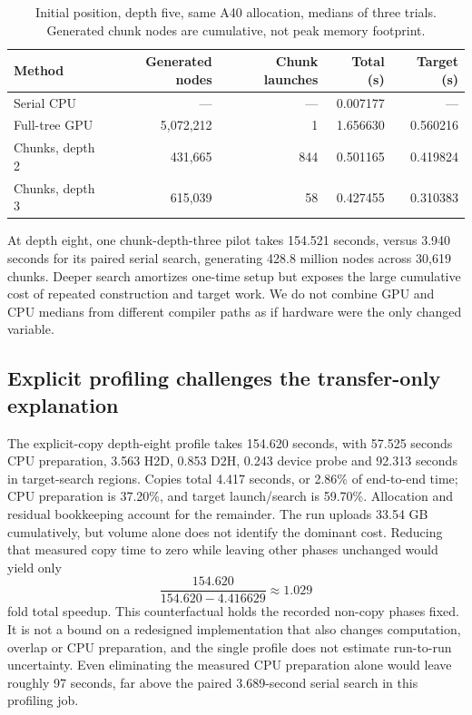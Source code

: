 \documentclass[11pt,a4paper]{article}
\begin{document}
\begin{table}[!htbp]\centering\small
\caption{Initial position, depth five, same A40 allocation, medians of three
trials. Generated chunk nodes are cumulative, not peak memory footprint.}
\label{tab:gpu}
\begin{tabular}{@{}lrrrr@{}}\toprule
Method & Generated nodes & Chunk launches & Total (s) & Target (s)\\\midrule
Serial CPU & --- & --- & 0.007177 & ---\\
Full-tree GPU & 5,072,212 & 1 & 1.656630 & 0.560216\\
Chunks, depth 2 & 431,665 & 844 & 0.501165 & 0.419824\\
Chunks, depth 3 & 615,039 & 58 & 0.427455 & 0.310383\\\bottomrule
\end{tabular}\end{table}

At depth eight, one chunk-depth-three pilot takes 154.521 seconds, versus
3.940 seconds for its paired serial search, generating 428.8 million nodes
across 30,619 chunks. Deeper search amortizes one-time setup but exposes the
large cumulative cost of repeated construction and target work. We do not
combine GPU and CPU medians from different compiler paths as if hardware were
the only changed variable.

\subsection{Explicit profiling challenges the transfer-only explanation}
The explicit-copy depth-eight profile takes 154.620 seconds, with 57.525
seconds CPU preparation, 3.563 H2D, 0.853 D2H, 0.243 device probe and 92.313
seconds in target-search regions. Copies total 4.417 seconds, or 2.86\% of
end-to-end time; CPU preparation is 37.20\%, and target launch/search is
59.70\%. Allocation and residual bookkeeping account for the remainder.
The run uploads 33.54 GB cumulatively, but volume alone does not identify the
dominant cost. Reducing that measured copy time to zero while leaving other
phases unchanged would yield only
\begin{equation}
  \frac{154.620}{154.620-4.416629}\approx 1.029
\end{equation}
fold total speedup. This counterfactual holds the recorded non-copy phases fixed. It is not a
bound on a redesigned implementation that also changes computation, overlap or
CPU preparation, and the single profile does not estimate run-to-run uncertainty. Even eliminating the measured
CPU preparation alone would leave roughly 97 seconds, far above the paired
3.689-second serial search in this profiling job.
\end{document}
